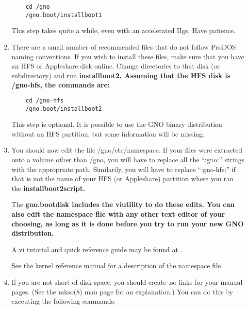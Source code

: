 \documentclass{report}
\begin{document}
\begin{enumerate}
\begin{verbatim}
	cd /gno
	/gno.boot/installboot1
\end{verbatim}

This step takes quite a while, even with an accelerated IIgs.
Have patience.

\item
There are a small number of recommended files that do not follow
ProDOS naming conventions.  If you wish to install these files,
make sure that you have an HFS or Appleshare disk online. Change
directories to that disk (or subdirectory) and run \bf installboot2\rm.
Assuming that the HFS disk is \bf/gno-hfs\rm, the commands are:

\begin{verbatim}
	cd /gno-hfs
	/gno.boot/installboot2
\end{verbatim}

This step is optional.  It is possible to use the GNO binary
distribution without an HFS partition, but some information
will be missing.

\item
You should now edit the file /gno/etc/namespace.  If your
files were extracted onto a volume other than /gno, you will
have to replace all the ``:gno:'' strings with the appropriate
path.  Similarily, you will have to replace ``:gno-hfs:'' if
that is not the name of your HFS (or Appleshare) partition
where you ran the \bf installboot2\rm script.

The \bf gno.boot\rm disk includes the \bf vi\rm utility to do these edits.
You can also edit the namespace file with any other text editor
of your choosing, as long as it is done before you try to run
your new GNO distribution.

A vi tutorial and quick reference guide may be found at
.

\begin{comment}
You may want to put /usr onto a different partition; it will
get fairly large over time.

If you have a RAM disk, you should consider having it renamed
to /tmp using renram5(8) or mktmp(8), in which case its entry
should be removed from the namespace file.

\end{comment}	    
See the kernel reference manual for a description of the
namespace file.

\item
If you are not short of disk space, you should create .so links
for your manual pages.  (See the mkso(8) man page for an
explanation.)  You can do this by executing the following
commands:


\end{enumerate}
\end{document}
